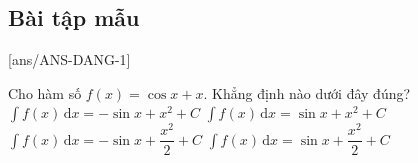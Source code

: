 \subsection{Bài tập mẫu}
[ans/ANS-DANG-1]
\begin{khung}
	\begin{vd}%
		Cho hàm số $f(x) = \cos {x} +x$. Khẳng định nào dưới đây đúng?
		\choice
		{$\displaystyle\int f(x) \mathrm{\,d}x = -\sin {x}+ x^2+ C$}	
		{$\displaystyle\int f(x) \mathrm{\,d}x = \sin {x}+ x^2+ C$}
		{$\displaystyle\int f(x) \mathrm{\,d}x = -\sin {x}+ \dfrac{x^2}{2} + C$}
		{\True $\displaystyle\int f(x) \mathrm{\,d}x = \sin {x}+ \dfrac{x^2}{2} + C$}
	\end{vd}
\end{khung}
